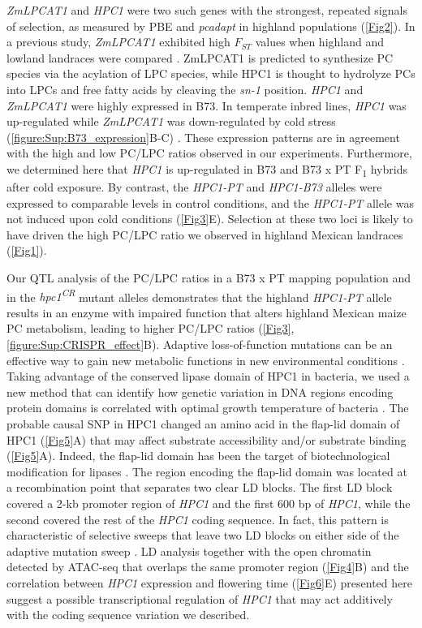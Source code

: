 \documentclass[9pt,twocolumn,twoside,lineno]{biorxiv}
\newcommand{\hpc}{\textit{HPC1}\xspace}
\begin{document}
\textit{ZmLPCAT1} and \hpc were two such genes with the strongest, repeated signals of selection, as measured by PBE and \textit{pcadapt} in highland populations (\cref{Fig2}). 
In a previous study, \textit{ZmLPCAT1} exhibited high $F_{ST}$ values when highland and lowland landraces were compared \cite{Takuno2015-uj}.
ZmLPCAT1 is predicted to synthesize PC species via the acylation of LPC species, while HPC1 is thought to hydrolyze PCs into LPCs and free fatty acids by cleaving the \textit{sn-1} position.
\hpc and \textit{ZmLPCAT1} were highly expressed in B73. 
In temperate inbred lines, \hpc was up-regulated while \textit{ZmLPCAT1} was down-regulated by cold stress (\cref{figure:Sup:B73_expression}B-C) \cite{Waters2017-nat}.
These expression patterns are in agreement with the high and low PC/LPC ratios observed in our experiments. 
Furthermore, we determined here that \hpc is up-regulated in B73 and B73 x PT F\textsubscript{1} hybrids after cold exposure. 
By contrast, the \textit{HPC1-PT} and \textit{HPC1-B73} alleles were expressed to comparable levels in control conditions, and the \textit{HPC1-PT} allele was not induced upon cold conditions (\cref{Fig3}E).
Selection at these two loci is likely to have driven the high PC/LPC ratio we observed in highland Mexican landraces (\cref{Fig1}). 

Our QTL analysis of the PC/LPC ratios in a B73 x PT mapping population and in the \textit{hpc1\textsuperscript{CR}} mutant alleles demonstrates that the highland \textit{HPC1-PT} allele results in an enzyme with impaired function that alters highland Mexican maize PC metabolism, leading to higher PC/LPC ratios (\cref{Fig3}, \cref{figure:Sup:CRISPR_effect}B). 
Adaptive loss-of-function mutations can be an effective way to gain new metabolic functions in new environmental conditions \cite{Hottes2013-np}.
Taking advantage of the conserved lipase domain of HPC1 in bacteria, we used a new method that can identify how genetic variation in DNA regions encoding protein domains is correlated with optimal growth temperature of bacteria \cite{Jensen2021-iv, Jensen2021-zm}.
The probable causal SNP in HPC1 changed an amino acid in the flap-lid domain of HPC1 (\cref{Fig5}A) that may affect substrate  accessibility and/or substrate binding (\cref{Fig5}A). 
Indeed, the flap-lid domain has been the target of biotechnological modification for lipases \cite{Khan2017-ua}.
The region encoding the flap-lid domain was located at a recombination point that separates two clear LD blocks. 
The first LD block covered a 2-kb promoter region of \hpc and the first 600 bp of \hpc, while the second covered the rest of the \hpc coding sequence. 
In fact, this pattern is characteristic of selective sweeps that leave two LD blocks on either side of the adaptive mutation sweep \cite{Kim2004-pa}. 
LD analysis together with the open chromatin detected by ATAC-seq that overlaps the same promoter region (\cref{Fig4}B) and the correlation between \hpc expression and flowering time (\cref{Fig6}E) presented here suggest a possible transcriptional regulation of \hpc that may act additively with the coding sequence variation we described.   
\end{document}
